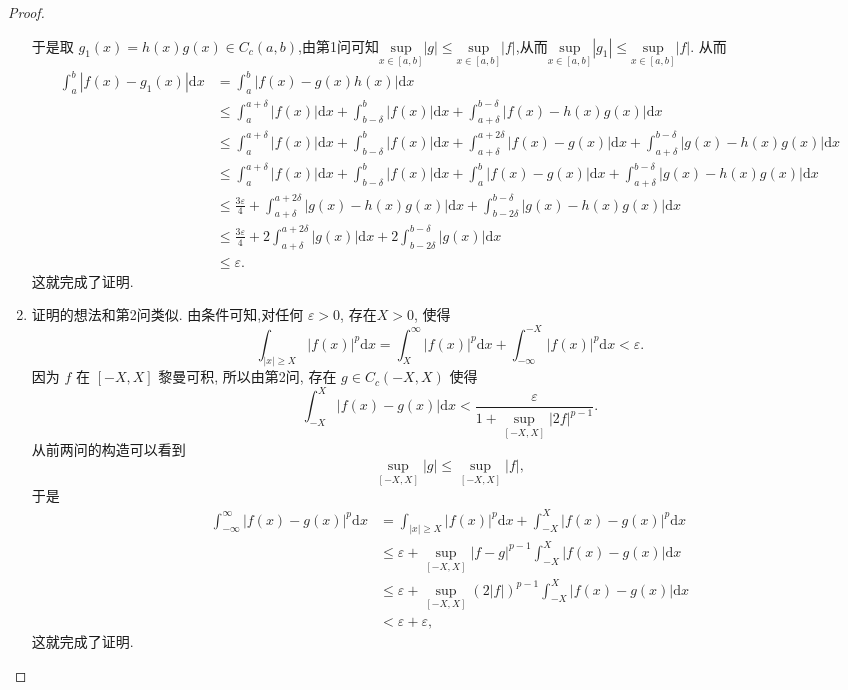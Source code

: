 \documentclass[../../main.tex]{subfiles}
\begin{document}
\begin{proof}
\begin{enumerate}[(1)]
于是取 $g_1(x) = h(x)g(x) \in C_c(a,b)$,由第1问可知$\underset{x\in \left[ a,b \right]}{\mathrm{sup}}\left| g \right|\leqslant \underset{x\in \left[ a,b \right]}{\mathrm{sup}}\left| f \right|$,从而$\underset{x\in \left[ a,b \right]}{\mathrm{sup}}\left| g_1 \right|\leqslant \underset{x\in \left[ a,b \right]}{\mathrm{sup}}\left| f \right|$.
从而
\begin{align*}
\int_{a}^{b} |f(x) - g_1(x)|\mathrm{d}x &= \int_{a}^{b} |f(x) - g(x)h(x)|\mathrm{d}x \\
&\leqslant \int_{a}^{a + \delta} |f(x)|\mathrm{d}x + \int_{b - \delta}^{b} |f(x)|\mathrm{d}x + \int_{a + \delta}^{b - \delta} |f(x) - h(x)g(x)|\mathrm{d}x \\
&\leqslant \int_{a}^{a + \delta} |f(x)|\mathrm{d}x + \int_{b - \delta}^{b} |f(x)|\mathrm{d}x + \int_{a + \delta}^{a + 2\delta} |f(x) - g(x)|\mathrm{d}x + \int_{a + \delta}^{b - \delta} |g(x) - h(x)g(x)|\mathrm{d}x \\
&\leqslant \int_{a}^{a + \delta} |f(x)|\mathrm{d}x + \int_{b - \delta}^{b} |f(x)|\mathrm{d}x + \int_{a}^{b} |f(x) - g(x)|\mathrm{d}x + \int_{a + \delta}^{b - \delta} |g(x) - h(x)g(x)|\mathrm{d}x \\
&\leqslant \frac{3\varepsilon}{4} + \int_{a + \delta}^{a + 2\delta} |g(x) - h(x)g(x)|\mathrm{d}x + \int_{b - 2\delta}^{b - \delta} |g(x) - h(x)g(x)|\mathrm{d}x \\
&\leqslant \frac{3\varepsilon}{4} + 2 \int_{a + \delta}^{a + 2\delta} |g(x)|\mathrm{d}x + 2 \int_{b - 2\delta}^{b - \delta} |g(x)|\mathrm{d}x \\
&\leqslant \varepsilon.
\end{align*}
这就完成了证明.

\item 证明的想法和第2问类似. 由条件可知,对任何 $\varepsilon > 0$, 存在$X > 0$, 使得
\[
\int_{|x| \geqslant X} |f(x)|^{p}\mathrm{d}x=
\int_{X}^{\infty} |f(x)|^{p}\mathrm{d}x + \int_{-\infty}^{-X} |f(x)|^{p}\mathrm{d}x < \varepsilon.
\]
因为 $f$ 在 $[-X,X]$ 黎曼可积, 所以由第2问, 存在 $g \in C_c(-X,X)$ 使得
\[
\int_{-X}^{X} |f(x) - g(x)|\mathrm{d}x < \frac{\varepsilon}{1 + \sup_{[-X,X]} |2f|^{p - 1}}.
\]
从前两问的构造可以看到
\[
\sup_{[-X,X]} |g| \leqslant \sup_{[-X,X]} |f|,
\]
于是
\begin{align*}
\int_{-\infty}^{\infty} |f(x) - g(x)|^{p}\mathrm{d}x &= \int_{|x| \geqslant X} |f(x)|^{p}\mathrm{d}x + \int_{-X}^{X} |f(x) - g(x)|^{p}\mathrm{d}x \\
&\leqslant \varepsilon + \sup_{[-X,X]} |f - g|^{p - 1} \int_{-X}^{X} |f(x) - g(x)|\mathrm{d}x \\
&\leqslant \varepsilon + \sup_{[-X,X]} (2|f|)^{p - 1} \int_{-X}^{X} |f(x) - g(x)|\mathrm{d}x \\
&< \varepsilon + \varepsilon,
\end{align*}
这就完成了证明. 
\end{enumerate}
\end{proof}
\end{document}
